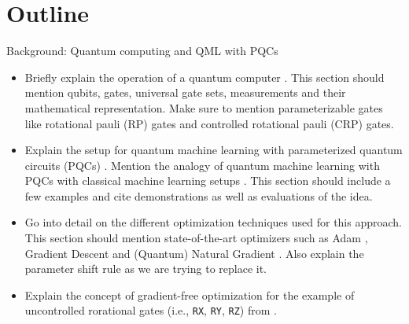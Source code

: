 \section{Outline}
Background: Quantum computing and QML with PQCs
\begin{itemize}
    \item
        Briefly explain the operation of a quantum computer
        \cite{nielsen_quantum_2007}.
        This section should mention qubits, gates, universal gate sets,
        measurements and their mathematical representation.
        Make sure to mention parameterizable gates like rotational pauli (RP)
        gates and controlled rotational pauli (CRP) gates.
    \item
        Explain the setup for quantum machine learning with parameterized
        quantum circuits (PQCs) \cite{mitarai_quantum_2018}.
        Mention the analogy of quantum machine learning with PQCs with
        classical machine learning setups \cite{bishop_pattern_2006}.
        This section should include a few examples and cite demonstrations
        as well as evaluations of the idea.
    \item
        Go into detail on the different optimization techniques used for
        this approach.
        This section should mention state-of-the-art optimizers such as
        Adam \cite{kingma_adam_2017}, Gradient Descent and
        (Quantum) Natural Gradient \cite{stokes_quantum_2020}.
        Also explain the parameter shift rule
        \cite{mitarai_quantum_2018,schuld_evaluating_2019} as we are trying
        to replace it.
    \item
        Explain the concept of gradient-free optimization for the example of
        uncontrolled rorational gates (i.e., \texttt{RX}, \texttt{RY},
        \texttt{RZ}) from
        \cite{wendenius_gradient-free_2023,ostaszewski_structure_2021}.
\end{itemize}

